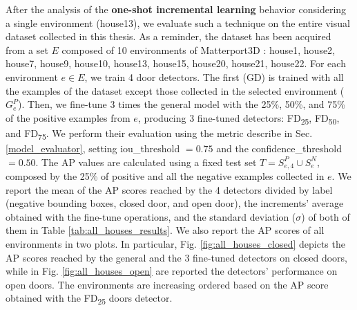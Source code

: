 After the analysis of the \textbf{one-shot incremental learning} behavior considering a single environment (\textsf{house13}), we evaluate such a technique on the entire visual dataset collected in this thesis. As a reminder, the dataset has been acquired from a set $E$ composed of 10 environments of Matterport3D \cite{matterport}: \textsf{house1}, \textsf{house2}, \textsf{house7}, \textsf{house9}, \textsf{house10}, \textsf{house13}, \textsf{house15}, \textsf{house20}, \textsf{house21},  \textsf{house22}.
For each environment $e \in E$, we train 4 door detectors. The first (\textsf{GD}) is trained with all the examples of the dataset except those collected in the selected environment ($G^{P}_e$). Then, we fine-tune 3 times the general model with the 25\%, 50\%, and 75\% of the positive examples from $e$,  producing 3 fine-tuned detectors: \textsf{FD\textsubscript{25}}, \textsf{FD\textsubscript{50}}, and \textsf{FD\textsubscript{75}}. We perform their  evaluation using the metric describe in Sec. \ref{model_evaluator}, setting \textsf{iou\_threshold} $= 0.75$ and the \textsf{confidence\_threshold} $= 0.50$. The AP values are calculated using a fixed test set $T = S^{P}_{e, 4} \cup S^{N}_{e}$, composed by the 25\% of positive and all the negative examples collected in $e$.  We report the mean of the AP scores reached by the 4 detectors divided by label (negative bounding boxes, closed door, and open door), the increments' average obtained with the fine-tune operations, and the standard deviation ($\sigma$) of both of them in Table \ref{tab:all_houses_results}. We also report the AP scores of all environments in two plots. In particular, Fig. \ref{fig:all_houses_closed} depicts the AP scores reached by the general and the 3 fine-tuned detectors on closed doors, while in Fig. \ref{fig:all_houses_open} are reported the detectors' performance on open doors. The environments are increasing ordered based on the AP score obtained with the \textsf{FD\textsubscript{25}} doors detector.

